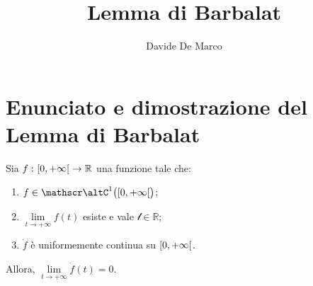 \documentclass[a4paper,12pt]{article}
\title{%
  \textbf{Lemma di Barbalat}\\
}
\author{%
  Davide De Marco
}
\date{}
\begin{document}
\maketitle
\section{Enunciato e dimostrazione del Lemma di Barbalat}
\begin{namelemma}[di Barbalat]\label{lemma:barbalat}
  Sia $f \, \colon \interval[open right]{0}{+\infty} \to \mathbb{R}$ una funzione tale che:
  \begin{enumerate}[label=\upshape({\itshape\roman*}\kern 0.6pt), ref=({\itshape\roman*}\kern 0.6pt)]
    \item $f \in \classC{1}\bigl(\interval[open right]{0}{+\infty}\bigr)$;
    \item $\lim\limits_{t \to + \infty} f(t)$ esiste e vale $\mathscr{l} \in \mathbb{R}$;
    \item $\dot{f}$ è uniformemente continua su $\interval[open right]{0}{+\infty}$.
  \end{enumerate}
  Allora, $\lim\limits_{t \to + \infty} \dot{f}(t) = 0$.
\end{namelemma}
\end{document}
